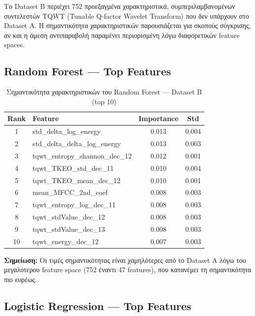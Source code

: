 Το Dataset B περιέχει 752 προεξαγμένα χαρακτηριστικά, συμπεριλαμβανομένων συντελεστών TQWT (Tunable Q-factor Wavelet Transform) που δεν υπάρχουν στο Dataset A. Η σημαντικότητα χαρακτηριστικών παρουσιάζεται για σκοπούς σύγκρισης, αν και η άμεση αντιπαραβολή παραμένει περιορισμένη λόγω διαφορετικών feature spaces.

\subsection{Random Forest --- Top Features}

\begin{table}[H]
\centering
\begin{tabular}{@{}clcc@{}}
\toprule
\textbf{Rank} & \textbf{Feature} & \textbf{Importance} & \textbf{Std} \\
\midrule
1 & std\_delta\_log\_energy & 0.013 & 0.004 \\
2 & std\_delta\_delta\_log\_energy & 0.013 & 0.003 \\
3 & tqwt\_entropy\_shannon\_dec\_12 & 0.012 & 0.001 \\
4 & tqwt\_TKEO\_std\_dec\_11 & 0.010 & 0.004 \\
5 & tqwt\_TKEO\_mean\_dec\_12 & 0.010 & 0.001 \\
6 & mean\_MFCC\_2nd\_coef & 0.008 & 0.003 \\
7 & tqwt\_entropy\_log\_dec\_11 & 0.008 & 0.003 \\
8 & tqwt\_stdValue\_dec\_12 & 0.008 & 0.003 \\
9 & tqwt\_stdValue\_dec\_13 & 0.008 & 0.003 \\
10 & tqwt\_energy\_dec\_12 & 0.007 & 0.003 \\
\bottomrule
\end{tabular}
\caption{Σημαντικότητα χαρακτηριστικών του Random Forest --- Dataset B (top 10)}
\label{tab:rf-datasetb-importance}
\end{table}

\textbf{Σημείωση:} Οι τιμές σημαντικότητας είναι χαμηλότερες από το Dataset A λόγω του μεγαλύτερου feature space (752 έναντι 47 features), που κατανέμει τη σημαντικότητα πιο ευρέως.

\subsection{Logistic Regression --- Top Features}

